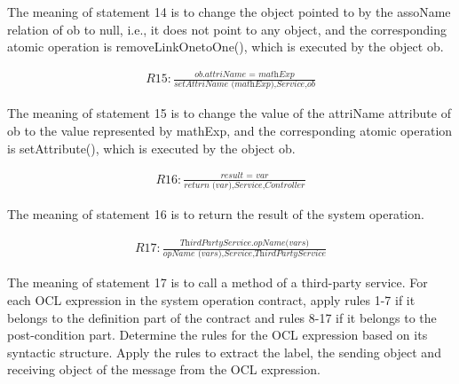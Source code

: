 \documentclass[pdflatex,sn-mathphys-num]{sn-jnl}%
\theoremstyle{thmstyleone}%
\theoremstyle{thmstyletwo}%
\theoremstyle{thmstylethree}%
\begin{document}
The meaning of statement 14 is to change the object pointed to by the assoName relation of ob to null, i.e., it does not point to any object, and the corresponding atomic operation is removeLinkOnetoOne(), which is executed by the object ob.

\[
\begin{array}{l}
    \textit{R15}: \frac{\textit{ob.attriName = mathExp}}{\textit{setAttriName (mathExp),Service,ob}}
\end{array}
\]

The meaning of statement 15 is to change the value of the attriName attribute of ob to the value represented by mathExp, and the corresponding atomic operation is setAttribute(), which is executed by the object ob.

\[
\begin{array}{l}
    \textit{R16}: \frac{\textit{result = var}}{\textit{return (var),Service,Controller}}
\end{array}
\]

The meaning of statement 16 is to return the result of the system operation. 

\[
\begin{array}{l}
    \textit{R17}: \frac{\textit{ThirdPartyService.opName(vars)}}{\textit{opName (vars),Service,ThirdPartyService}}
\end{array}
\]

The meaning of statement 17 is to call a method of a third-party service.
For each OCL expression in the system operation contract, apply rules 1-7 if it belongs to the definition part of the contract and rules 8-17 if it belongs to the post-condition part. Determine the rules for the OCL expression based on its syntactic structure. Apply the rules to extract the label, the sending object and receiving object of the message from the OCL expression.
\end{document}
